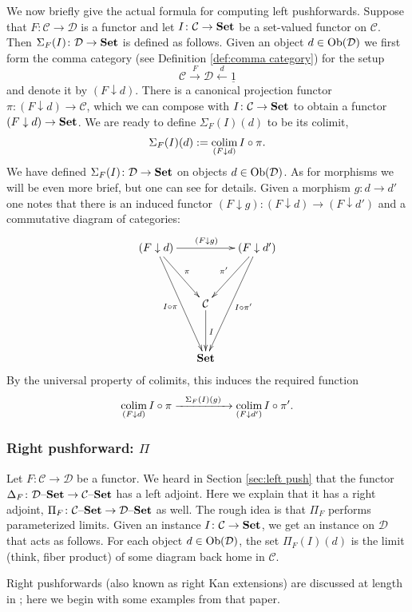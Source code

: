 \documentclass{book}
\def\tn{\textnormal}
\def\mc{\mathcal}
\def\Ob{\tn{Ob}}
\def\to{\rightarrow}
\def\down{\downarrrow}
\def\taking{\colon}
\def\down{\downarrow}
\def\ul{\underline}
\newcommand{\To}[1]{\xrightarrow{#1}}
\newcommand{\Too}[1]{\xrightarrow{\ \ #1\ \ }}
\newcommand{\From}[1]{\xleftarrow{#1}}
\def\Set{{\bf Set}}
\def\set{{\text \textendash}{\bf Set}}
\def\colim{\mathop{\tn{colim}}}
\def\mcC{\mc{C}}
\def\mcD{\mc{D}}
\theoremstyle{remark}
\theoremstyle{definition}
\begin{document}
We now briefly give the actual formula for computing left pushforwards. Suppose that $F\taking\mcC\to\mcD$ is a functor and let $I\taking\mcC\to\Set$ be a set-valued functor on $\mcC$. Then $\Sigma_F(I)\taking\mcD\to\Set$ is defined as follows. Given an object $d\in\Ob(\mcD)$ we first form the comma category (see Definition \ref{def:comma category}) for the setup
$$\mcC\To{F}\mcD\From{d}\ul{1}$$
and denote it by $(F\down d)$. There is a canonical projection functor $\pi\taking(F\down d)\to\mcC$, which we can compose with $I\taking\mcC\to\Set$ to obtain a functor $(F\down d)\to\Set$. We are ready to define $\Sigma_F(I)(d)$ to be its colimit,
$$\Sigma_F(I)(d):=\colim_{(F\down d)}I\circ\pi.$$
We have defined $\Sigma_F(I)\taking\mcD\to\Set$ on objects $d\in\Ob(\mcD)$. As for morphisms we will be even more brief, but one can see \cite{Sp1} for details. Given a morphism $g\taking d\to d'$ one notes that there is an induced functor $(F\down g)\taking (F\down d)\to(F\down d')$ and a commutative diagram of categories:
$$
\xymatrix@=15pt{
(F\down d)\ar[rr]^{(F\down g)}\ar[ddr]^{\pi}\ar[ddddr]_{I\circ\pi}&&(F\down d')\ar[ddl]_{\pi'}\ar[ddddl]^{I\circ\pi'}\\\\
&\mcC\ar[dd]^I\\\\
&\Set
}
$$
By the universal property of colimits, this induces the required function $$\colim_{(F\down d)}I\circ\pi\Too{\Sigma_F(I)(g)}\colim_{(F\down d')}I\circ\pi'.$$


\subsubsection{Right pushforward: $\Pi$}

Let $F\taking\mcC\to\mcD$ be a functor. We heard in Section \ref{sec:left push} that the functor $\Delta_F\taking\mcD\set\to\mcC\set$ has a left adjoint. Here we explain that it has a right adjoint, $\Pi_F\taking\mcC\set\to\mcD\set$ as well. The rough idea is that $\Pi_F$ performs parameterized limits. Given an instance $I\taking\mcC\to\Set$, we get an instance on $\mcD$ that acts as follows. For each object $d\in\Ob(\mcD)$, the set $\Pi_F(I)(d)$ is the limit (think, fiber product) of some diagram back home in $\mcC$. 

Right pushforwards (also known as right Kan extensions) are discussed at length in \cite{Sp1}; here we begin with some examples from that paper.
\end{document}
